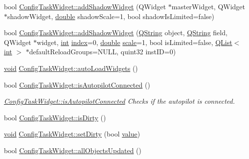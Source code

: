 \begin{DoxyCompactItemize}
\item 
bool \hyperlink{group___u_a_v_object_widget_utils_ga726f8720d2d1bb52d38a6425fbfab448}{Config\-Task\-Widget\-::add\-Shadow\-Widget} (Q\-Widget $\ast$master\-Widget, Q\-Widget $\ast$shadow\-Widget, \hyperlink{_super_l_u_support_8h_a8956b2b9f49bf918deed98379d159ca7}{double} shadow\-Scale=1, bool shadow\-Is\-Limited=false)
\item 
bool \hyperlink{group___u_a_v_object_widget_utils_ga285c7e48c6b730133169c0226cbc59c4}{Config\-Task\-Widget\-::add\-Shadow\-Widget} (\hyperlink{group___u_a_v_objects_plugin_gab9d252f49c333c94a72f97ce3105a32d}{Q\-String} object, \hyperlink{group___u_a_v_objects_plugin_gab9d252f49c333c94a72f97ce3105a32d}{Q\-String} field, Q\-Widget $\ast$widget, \hyperlink{ioapi_8h_a787fa3cf048117ba7123753c1e74fcd6}{int} \hyperlink{glext_8h_ab47dd9958bcadea08866b42bf358e95e}{index}=0, \hyperlink{_super_l_u_support_8h_a8956b2b9f49bf918deed98379d159ca7}{double} \hyperlink{glext_8h_a281421b881aa7a1266842b73a3bc7655}{scale}=1, bool is\-Limited=false, \hyperlink{class_q_list}{Q\-List}$<$ \hyperlink{ioapi_8h_a787fa3cf048117ba7123753c1e74fcd6}{int} $>$ $\ast$default\-Reload\-Groups=N\-U\-L\-L, quint32 inst\-I\-D=0)
\item 
\hyperlink{group___u_a_v_objects_plugin_ga444cf2ff3f0ecbe028adce838d373f5c}{void} \hyperlink{group___u_a_v_object_widget_utils_ga945551d9d4d280fe2cd14bc2646d8fbf}{Config\-Task\-Widget\-::auto\-Load\-Widgets} ()
\item 
bool \hyperlink{group___u_a_v_object_widget_utils_gad61b70a01e85822c5838c2c5833c22fd}{Config\-Task\-Widget\-::is\-Autopilot\-Connected} ()
\begin{DoxyCompactList}\small\item\em \hyperlink{group___u_a_v_object_widget_utils_gad61b70a01e85822c5838c2c5833c22fd}{Config\-Task\-Widget\-::is\-Autopilot\-Connected} Checks if the autopilot is connected. \end{DoxyCompactList}\item 
bool \hyperlink{group___u_a_v_object_widget_utils_ga2d7e19cef57df7b30741b4901b5a190f}{Config\-Task\-Widget\-::is\-Dirty} ()
\item 
\hyperlink{group___u_a_v_objects_plugin_ga444cf2ff3f0ecbe028adce838d373f5c}{void} \hyperlink{group___u_a_v_object_widget_utils_gae75127fbfffe10458defc31a6a18c0f8}{Config\-Task\-Widget\-::set\-Dirty} (bool \hyperlink{glext_8h_aa0e2e9cea7f208d28acda0480144beb0}{value})
\item 
bool \hyperlink{group___u_a_v_object_widget_utils_ga62e7277f3b8228d44da13a2355b96e9a}{Config\-Task\-Widget\-::all\-Objects\-Updated} ()

\end{DoxyCompactItemize}
